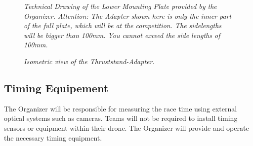 \documentclass{article}
\begin{document}
\begin{figure}
  \centering
\caption{\textit{Technical Drawing of the Lower Mounting Plate provided by the Organizer. Attention: The Adapter shown here is only the inner part of the full plate, which will be at the competition. The sidelengths will be bigger than 100mm. You cannot exceed the side lengths of 100mm.}}
\end{figure}

\begin{figure}[h!]
 \centering
\caption{\textit{Isometric view of the Thruststand-Adapter.}}
\end{figure}



\subsection{Timing Equipement}
The Organizer will be responsible for measuring the race time using external optical systems such as cameras. Teams will not be required to install timing sensors or equipment within their drone. The Organizer will provide and operate the necessary timing equipment.
\end{document}

